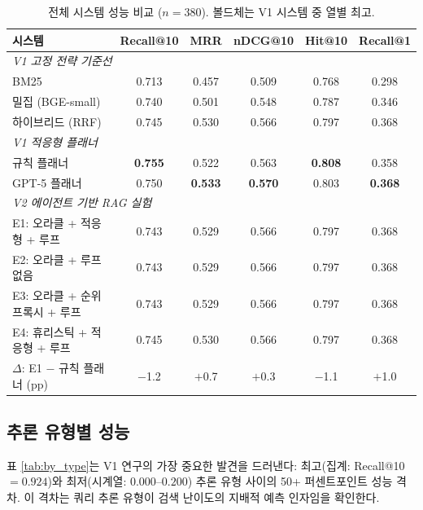 \documentclass[11pt, a4paper]{article}
\begin{document}
\begin{table}[htbp]
\centering
\caption{전체 시스템 성능 비교 ($n{=}380$). 볼드체는 V1 시스템 중 열별 최고.}
\label{tab:main}
\begin{tabular}{lccccc}
\toprule
\textbf{시스템} & \textbf{Recall@10} & \textbf{MRR} & \textbf{nDCG@10} & \textbf{Hit@10} & \textbf{Recall@1} \\
\midrule
\multicolumn{6}{l}{\textit{V1 고정 전략 기준선}} \\
BM25               & 0.713 & 0.457 & 0.509 & 0.768 & 0.298 \\
밀집 (BGE-small)   & 0.740 & 0.501 & 0.548 & 0.787 & 0.346 \\
하이브리드 (RRF)   & 0.745 & 0.530 & 0.566 & 0.797 & 0.368 \\
\multicolumn{6}{l}{\textit{V1 적응형 플래너}} \\
규칙 플래너        & \textbf{0.755} & 0.522 & 0.563 & \textbf{0.808} & 0.358 \\
GPT-5 플래너       & 0.750 & \textbf{0.533} & \textbf{0.570} & 0.803 & \textbf{0.368} \\
\multicolumn{6}{l}{\textit{V2 에이전트 기반 RAG 실험}} \\
E1: 오라클 + 적응형 + 루프    & 0.743 & 0.529 & 0.566 & 0.797 & 0.368 \\
E2: 오라클 + 루프 없음        & 0.743 & 0.529 & 0.566 & 0.797 & 0.368 \\
E3: 오라클 + 순위 프록시 + 루프 & 0.743 & 0.529 & 0.566 & 0.797 & 0.368 \\
E4: 휴리스틱 + 적응형 + 루프  & 0.745 & 0.530 & 0.566 & 0.797 & 0.368 \\
\midrule
$\Delta$: E1 $-$ 규칙 플래너 (pp) & $-$1.2 & $+$0.7 & $+$0.3 & $-$1.1 & $+$1.0 \\
\bottomrule
\end{tabular}
\end{table}

\FloatBarrier

\subsection{추론 유형별 성능}

표 \ref{tab:by_type}는 V1 연구의 가장 중요한 발견을 드러낸다: 최고(집계: Recall@10$={0.924}$)와 최저(시계열: $0.000$--$0.200$) 추론 유형 사이의 50+ 퍼센트포인트 성능 격차. 이 격차는 쿼리 추론 유형이 검색 난이도의 지배적 예측 인자임을 확인한다.
\end{document}
